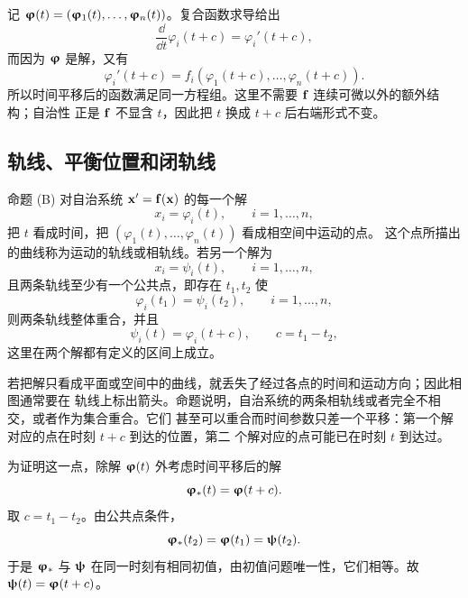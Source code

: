 记 \(\vect{\varphi}(t)=(\varphi_1(t),\ldots,\varphi_n(t))\)。复合函数求导给出
\[
 \frac{\dd}{\dd t}\varphi_i(t+c)
 =\varphi_i'(t+c),
\]
而因为 \(\vect{\varphi}\) 是解，又有
\[
 \varphi_i'(t+c)
 =f_i(\varphi_1(t+c),\ldots,\varphi_n(t+c)).
\]
所以时间平移后的函数满足同一方程组。这里不需要 \(\vect{f}\) 连续可微以外的额外结构；自治性
正是 \(\vect{f}\) 不显含 \(t\)，因此把 \(t\) 换成 \(t+c\) 后右端形式不变。

\subsection*{轨线、平衡位置和闭轨线}

\begin{sourceitem}{命题 (B)}
对自治系统 \(\vect{x}'=\vect{f}(\vect{x})\) 的每一个解
\begin{equation}
 x_i=\varphi_i(t),\qquad i=1,\ldots,n,
 \tag{7}
\end{equation}
把 \(t\) 看成时间，把 \((\varphi_1(t),\ldots,\varphi_n(t))\) 看成相空间中运动的点。
这个点所描出的曲线称为运动的轨线或相轨线。若另一个解为
\begin{equation}
 x_i=\psi_i(t),\qquad i=1,\ldots,n,
 \tag{8}
\end{equation}
且两条轨线至少有一个公共点，即存在 \(t_1,t_2\) 使
\begin{equation}
 \varphi_i(t_1)=\psi_i(t_2),\qquad i=1,\ldots,n,
 \tag{9}
\end{equation}
则两条轨线整体重合，并且
\begin{equation}
 \psi_i(t)=\varphi_i(t+c),\qquad c=t_1-t_2,
 \tag{10}
\end{equation}
这里在两个解都有定义的区间上成立。
\end{sourceitem}

若把解只看成平面或空间中的曲线，就丢失了经过各点的时间和运动方向；因此相图通常要在
轨线上标出箭头。命题说明，自治系统的两条相轨线或者完全不相交，或者作为集合重合。它们
甚至可以重合而时间参数只差一个平移：第一个解对应的点在时刻 \(t+c\) 到达的位置，第二
个解对应的点可能已在时刻 \(t\) 到达过。

为证明这一点，除解 \(\vect{\varphi}(t)\) 外考虑时间平移后的解
\[
 \vect{\varphi}_*(t)=\vect{\varphi}(t+c).
\]
取 \(c=t_1-t_2\)。由公共点条件，
\[
 \vect{\varphi}_*(t_2)=\vect{\varphi}(t_1)=\vect{\psi}(t_2).
\]
于是 \(\vect{\varphi}_*\) 与 \(\vect{\psi}\) 在同一时刻有相同初值，由初值问题唯一性，它们相等。故
\(\vect{\psi}(t)=\vect{\varphi}(t+c)\)。

